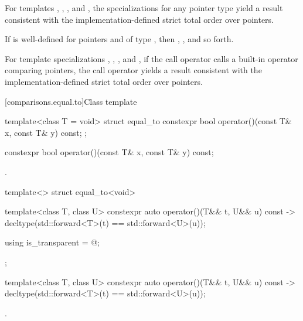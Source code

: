\pnum
For templates , , , and
, the specializations for any pointer type
yield a result consistent with the
implementation-defined strict total order over pointers.
\begin{note}
If  is well-defined
for pointers  and  of type ,
then ,
, and so forth.
\end{note}
For template specializations , ,
, and ,
if the call operator calls a built-in operator comparing pointers,
the call operator yields a result consistent
with the implementation-defined strict total order over pointers.

[comparisons.equal.to]{Class template }

%
\begin{itemdecl}
template<class T = void> struct equal_to {
  constexpr bool operator()(const T& x, const T& y) const;
};
\end{itemdecl}

%
\begin{itemdecl}
constexpr bool operator()(const T& x, const T& y) const;
\end{itemdecl}

\begin{itemdescr}
\pnum
\returns
{}.
\end{itemdescr}

%
\begin{itemdecl}
template<> struct equal_to<void> {
  template<class T, class U> constexpr auto operator()(T&& t, U&& u) const
    -> decltype(std::forward<T>(t) == std::forward<U>(u));

  using is_transparent = @\unspec@;
};
\end{itemdecl}

%
\begin{itemdecl}
template<class T, class U> constexpr auto operator()(T&& t, U&& u) const
    -> decltype(std::forward<T>(t) == std::forward<U>(u));
\end{itemdecl}

\begin{itemdescr}
\pnum
\returns
{}.
\end{itemdescr}

